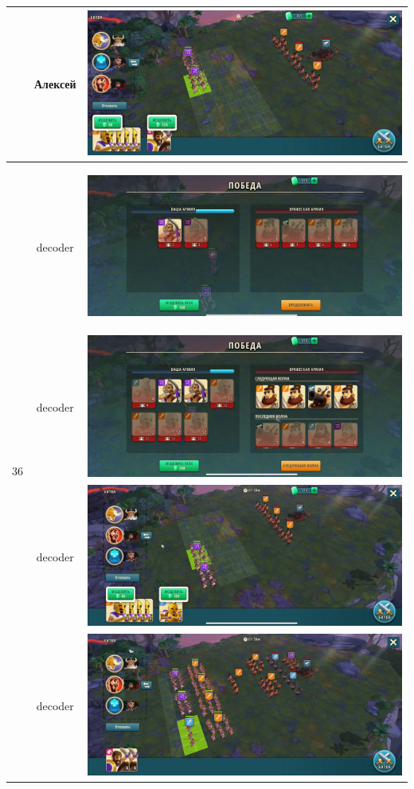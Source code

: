 \begin{longtable}{|c|c|c|}
	& Алексей &
	\includegraphics[width=0.75\linewidth]{./parts/media/TreasureHunt/36/alexey/photo_2022-04-15_11-02-50.jpg} \\
	\hline
	\multirow{16}{*}{36} & decoder &
	\hypertarget{fight36}{\includegraphics[width=0.75\linewidth]{./parts/media/TreasureHunt/36/decoder/photo_2022-04-07_10-07-36.jpg}} \\
	& decoder &
	\includegraphics[width=0.75\linewidth]{./parts/media/TreasureHunt/36/decoder/photo_2022-04-07_10-07-28.jpg} \\
	& decoder &
	\includegraphics[width=0.75\linewidth]{./parts/media/TreasureHunt/36/decoder/photo_2022-04-07_10-07-32.jpg} \\
	& decoder &
	\includegraphics[width=0.75\linewidth]{./parts/media/TreasureHunt/36/decoder/photo_2022-04-07_10-07-13.jpg} \\

\end{longtable}
